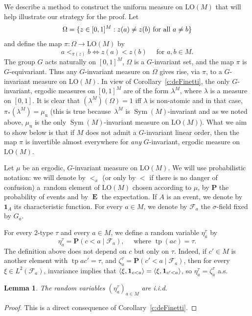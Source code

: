 \documentclass[JEP,XML,SOM,Unicode,published]{cedram}
\let\mathcal\mathscr
\theoremstyle{plain}
\newtheorem{lemma}[theorem]{Lemma}
\theoremstyle{definition}
\newcommand{\bP}{{\mathbf P}}\let\Pr\bP
\newcommand{\bOne}{{\mathbf 1}}
\newcommand{\cF}{\mathcal{F}}
\DeclareMathOperator{\E}{\mathbf{E}}
\DeclareMathOperator{\Sym}{Sym}
\DeclareMathOperator{\tp}{tp}
\DeclarePairedDelimiter\ip{\langle}{\rangle}
\DeclarePairedDelimiter\set{\{}{\}}
\newcommand{\LO}{\mathrm{LO}}
\newcommand{\muu}{\mu_{\mathrm{u}}}
\begin{document}
We describe a method to construct the uniform measure on $\LO(M)$ that will help illustrate our strategy for the proof. Let
\begin{equation*}
\Omega = \set{z \in [0, 1]^M : z(a) \neq z(b) \text{ for all } a \neq b}
\end{equation*}
and define the map $\pi \colon \Omega \to \LO(M)$ by
\begin{equation}
\label{eq:def-pi}
a <_{\pi(z)} b \iff z(a) < z(b) \quad \text{ for } a, b \in M.
\end{equation}
The group $G$ acts naturally on $[0, 1]^M$, $\Omega$ is a $G$-invariant set, and the map $\pi$ is $G$\nobreakdash-equivariant. Thus any $G$-invariant measure on $\Omega$ gives rise, via $\pi$, to a $G$-invariant measure on $\LO(M)$. In view of Corollary~\ref{c:deFinetti}, the only $G$-invariant, ergodic measures on $[0, 1]^M$ are of the form $\lambda^M$, where $\lambda$ is a measure on $[0, 1]$. It is clear that \hbox{$(\lambda^M)(\Omega) = 1$} iff $\lambda$ is non-atomic and in that case, $\pi_*(\lambda^M) = \muu$ (this is true because~$\lambda^M$ is $\Sym(M)$-invariant and as we noted above, $\muu$ is the only $\Sym(M)$-invariant measure on $\LO(M)$). What we aim to show below is that if $M$ does not admit a $G$-invariant linear order, then the map $\pi$ is invertible almost everywhere for \emph{any} $G$-invariant, ergodic measure on $\LO(M)$.

Let $\mu$ be an ergodic, $G$-invariant measure on $\LO(M)$. We will use probabilistic notation: we will denote by $<_x$ (or only by $<$ if there is no danger of confusion) a~random element of $\LO(M)$ chosen according to $\mu$, by $\bP$ the probability of events and by $\E$ the expectation. If $A$ is an event, we denote by $\bOne_A$ its characteristic function. For every $a \in M$, we denote by $\cF_a$ the $\sigma$-field fixed by $G_a$.

For every $2$-type $\tau$ and every $a \in M$, we define a random variable $\eta^\tau_a$ by
\begin{equation*}
\eta^\tau_a = \Pr(c < a \mid \cF_a), \quad \text{ where } \tp(ac) = \tau.
\end{equation*}
The definition above does not depend on $c$ but only on $\tau$. Indeed, if $c' \in M$ is another element with $\tp ac' = \tau$, and $\zeta_a^{\tau} = \Pr(c' < a \mid \cF_a)$, then for every $\xi \in L^2(\cF_a)$, invariance implies that $\ip{\xi, \bOne_{c < a}} = \ip{\xi, \bOne_{c' < a}}$, so $\eta_a^\tau = \zeta_a^\tau$ a.s.

\pagebreak[2]
\begin{lemma}
\label{Lem:i.i.d.}
The random variables $(\eta^\tau_a)_{a\in M}$ are i.i.d.
\end{lemma}
\begin{proof}
This is a direct consequence of Corollary~\ref{c:deFinetti}.
\end{proof}
\end{document}

